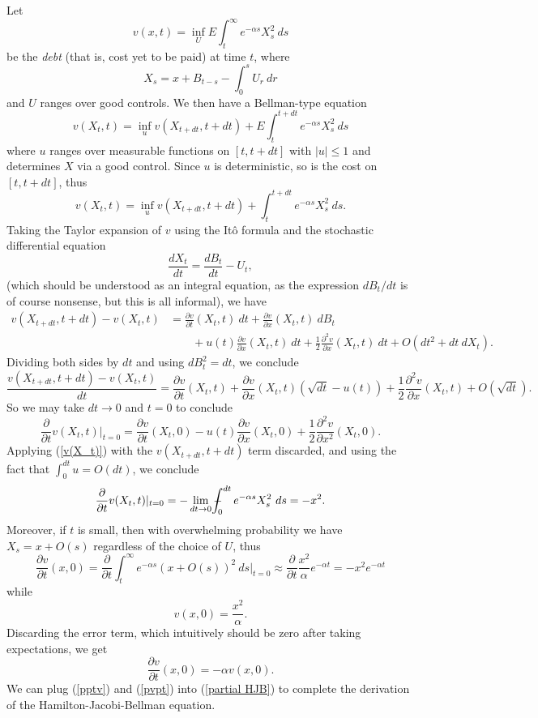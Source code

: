 \documentclass[10pt]{article}
\theoremstyle{definition}
\def\Xint#1{\mathchoice
{\XXint\displaystyle\textstyle{#1}}%
{\XXint\textstyle\scriptstyle{#1}}%
{\XXint\scriptstyle\scriptscriptstyle{#1}}%
{\XXint\scriptscriptstyle\scriptscriptstyle{#1}}%
\!\int}
\def\XXint#1#2#3{{\setbox0=\hbox{$#1{#2#3}{\int}$ }
\vcenter{\hbox{$#2#3$ }}\kern-.6\wd0}}
\def\dashint{\Xint-}
\begin{document}
Let
$$v(x, t) = \inf_U E\int_t^\infty e^{-\alpha s} X_s^2 ~ds$$
be the \emph{debt} (that is, cost yet to be paid) at time $t$, where
$$X_s = x + B_{t - s} - \int_0^s U_r ~dr$$
and $U$ ranges over good controls.
We then have a Bellman-type equation
$$v(X_t, t) = \inf_u v(X_{t + dt}, t + dt) + E\int_t^{t + dt} e^{-\alpha s} X_s^2 ~ds$$
where $u$ ranges over measurable functions on $[t, t + dt]$ with $|u| \leq 1$ and determines $X$ via a good control.
Since $u$ is deterministic, so is the cost on $[t, t + dt]$, thus
\begin{equation}
\label{v(X_t)}
v(X_t, t) = \inf_u v(X_{t + dt}, t + dt) + \int_t^{t + dt} e^{-\alpha s} X_s^2 ~ds.
\end{equation}
Taking the Taylor expansion of $v$ using the It\^o formula and the stochastic differential equation
$$\frac{dX_t}{dt} = \frac{dB_t}{dt} - U_t,$$
(which should be understood as an integral equation, as the expression $dB_t/dt$ is of course nonsense, but this is all informal), we have
\begin{align*}
v(X_{t + dt}, t + dt) - v(X_t, t) &= \frac{\partial v}{\partial t}(X_t, t) ~dt + \frac{\partial v}{\partial x}(X_t, t) ~dB_t \\
&\qquad+ u(t)\frac{\partial v}{\partial x}(X_t, t) ~dt + \frac{1}{2}\frac{\partial^2 v}{\partial x}(X_t, t) ~dt + O(dt^2 + dt ~dX_t).
\end{align*}
Dividing both sides by $dt$ and using $dB_t^2 = dt$, we conclude
$$\frac{v(X_{t + dt}, t + dt) - v(X_t, t)}{dt} = \frac{\partial v}{\partial t}(X_t, t) + \frac{\partial v}{\partial x}(X_t, t)\left(\sqrt{dt} - u(t)\right) + \frac{1}{2}\frac{\partial^2 v}{\partial x}(X_t, t) + O(\sqrt{dt}).$$
So we may take $dt \to 0$ and $t = 0$ to conclude
\begin{equation}
\label{partial HJB}
\frac{\partial}{\partial t}v(X_t, t)|_{t = 0} = \frac{\partial v}{\partial t}(X_t, 0) - u(t)\frac{\partial v}{\partial x}(X_t, 0) + \frac{1}{2}\frac{\partial^2 v}{\partial x^2}(X_t, 0).
\end{equation}
Applying (\ref{v(X_t)}) with the $v(X_{t + dt}, t + dt)$ term discarded, and using the fact that $\int_0^{dt} u = O(dt)$, we conclude
\begin{equation}
\label{pptv}
\frac{\partial}{\partial t}v(X_t, t)|_{t = 0} = -\lim_{dt \to 0} \dashint_0^{dt} e^{-\alpha s} X_s^2 ~ds = -x^2.
\end{equation}
Moreover, if $t$ is small, then with overwhelming probability we have $X_s = x + O(s)$ regardless of the choice of $U$, thus
$$\frac{\partial v}{\partial t}(x, 0) = \frac{\partial}{\partial t} \int_t^\infty e^{-\alpha s}(x + O(s))^2 ~ds\bigg|_{t = 0} \approx \frac{\partial}{\partial t} \frac{x^2}{\alpha}e^{-\alpha t} = -x^2e^{-\alpha t}$$
while
$$v(x, 0) = \frac{x^2}{\alpha}.$$
Discarding the error term, which intuitively should be zero after taking expectations, we get
\begin{equation}
\label{pvpt}
\frac{\partial v}{\partial t}(x, 0) = -\alpha v(x, 0).
\end{equation}
We can plug (\ref{pptv}) and (\ref{pvpt}) into (\ref{partial HJB}) to complete the derivation of the Hamilton-Jacobi-Bellman equation.
\end{document}
